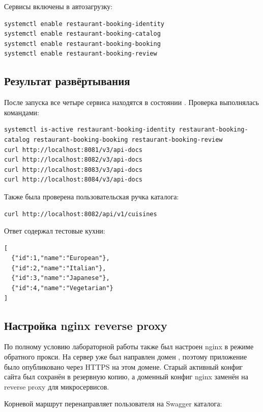 \documentclass[14pt,a4paper]{extarticle}
\newcommand{\code}[1]{\texttt{\detokenize{#1}}}
\begin{document}
Сервисы включены в автозагрузку:

\begin{lstlisting}[style=codestyle]
systemctl enable restaurant-booking-identity
systemctl enable restaurant-booking-catalog
systemctl enable restaurant-booking-booking
systemctl enable restaurant-booking-review
\end{lstlisting}

\subsection{Результат развёртывания}

После запуска все четыре сервиса находятся в состоянии \code{active}. Проверка выполнялась командами:

\begin{lstlisting}[style=codestyle]
systemctl is-active restaurant-booking-identity restaurant-booking-catalog restaurant-booking-booking restaurant-booking-review
curl http://localhost:8081/v3/api-docs
curl http://localhost:8082/v3/api-docs
curl http://localhost:8083/v3/api-docs
curl http://localhost:8084/v3/api-docs
\end{lstlisting}

Также была проверена пользовательская ручка каталога:

\begin{lstlisting}[style=codestyle]
curl http://localhost:8082/api/v1/cuisines
\end{lstlisting}

Ответ содержал тестовые кухни:

\begin{lstlisting}[style=codestyle]
[
  {"id":1,"name":"European"},
  {"id":2,"name":"Italian"},
  {"id":3,"name":"Japanese"},
  {"id":4,"name":"Vegetarian"}
]
\end{lstlisting}

\subsection{Настройка nginx reverse proxy}

По полному условию лабораторной работы также был настроен nginx в режиме обратного прокси. На сервер уже был направлен домен \code{ezhidze.ru}, поэтому приложение было опубликовано через HTTPS на этом домене. Старый активный конфиг сайта был сохранён в резервную копию, а доменный конфиг nginx заменён на reverse proxy для микросервисов.

Корневой маршрут перенаправляет пользователя на Swagger каталога:
\end{document}
